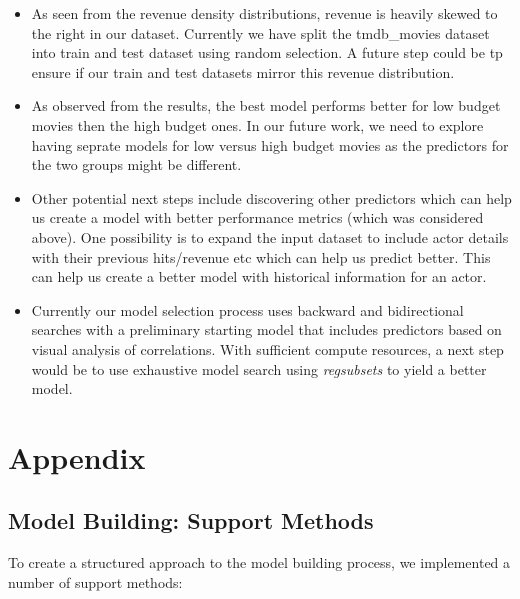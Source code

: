 \documentclass[
]{article}
\begin{document}
\begin{itemize}
\item
  As seen from the revenue density distributions, revenue is heavily
  skewed to the right in our dataset. Currently we have split the
  tmdb\_movies dataset into train and test dataset using random
  selection. A future step could be tp ensure if our train and test
  datasets mirror this revenue distribution.
\item
  As observed from the results, the best model performs better for low
  budget movies then the high budget ones. In our future work, we need
  to explore having seprate models for low versus high budget movies as
  the predictors for the two groups might be different.
\item
  Other potential next steps include discovering other predictors which
  can help us create a model with better performance metrics (which was
  considered above). One possibility is to expand the input dataset to
  include actor details with their previous hits/revenue etc which can
  help us predict better. This can help us create a better model with
  historical information for an actor.
\item
  Currently our model selection process uses backward and bidirectional
  searches with a preliminary starting model that includes predictors
  based on visual analysis of correlations. With sufficient compute
  resources, a next step would be to use exhaustive model search using
  \emph{regsubsets} to yield a better model.
\end{itemize}

\hypertarget{appendix}{%
\section{Appendix}\label{appendix}}

\hypertarget{model-building-support-methods}{%
\subsection{Model Building: Support
Methods}\label{model-building-support-methods}}

To create a structured approach to the model building process, we
implemented a number of support methods:
\end{document}
